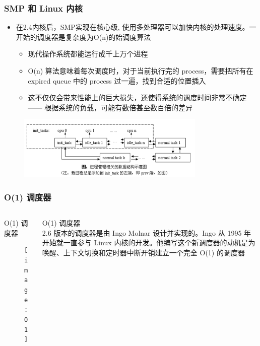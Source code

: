 \begin{frame}
	\frametitle{SMP 和 Linux 内核}
	
	\begin{itemize}
		
		\item 在2.4内核后，SMP实现在核心级, 使用多处理器可以加快内核的处理速度。一开始的调度器是复杂度为O(n)的始调度算法
		
		\begin{itemize}
			\item 现代操作系统都能运行成千上万个进程
			\item O(n) 算法意味着每次调度时，对于当前执行完的 process，需要把所有在 expired queue 中的 process 过一遍，找到合适的位置插入
			\item 这不仅仅会带来性能上的巨大损失，还使得系统的调度时间非常不确定 —— 根据系统的负载，可能有数倍甚至数百倍的差异
		\end{itemize}
	\end{itemize}
	
    \begin{figure}
    \includegraphics[width=0.8\textwidth,natwidth=1011,natheight=343]{figs/linux-2.4-sched.png}
    \end{figure}
	
	
\end{frame}
\begin{frame}
	\frametitle{ O(1) 调度器}
	\begin{columns}
		\begin{column}{.5\textwidth}
			\Large \centering
			O(1) 调度器
            \begin{figure}
    			\texttt{[image: O1]}
            \end{figure}
	
		\end{column}
		
		\begin{column}{.5\textwidth}
			\large
			O(1) 调度器 \\
			
2.6 版本的调度器是由 Ingo Molnar 设计并实现的。Ingo 从 1995 年开始就一直参与 Linux 内核的开发。他编写这个新调度器的动机是为唤醒、上下文切换和定时器中断开销建立一个完全 O(1) 的调度器
			
		\end{column}
	\end{columns}
\end{frame}



